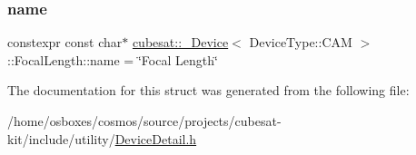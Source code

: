 \subsubsection{\texorpdfstring{name}{name}}
{\footnotesize\ttfamily constexpr const char$\ast$ \hyperlink{structcubesat_1_1__Device}{cubesat\+::\+\_\+\+Device}$<$ Device\+Type\+::\+C\+AM $>$\+::Focal\+Length\+::name = \char`\"{}Focal Length\char`\"{}\hspace{0.3cm}{\ttfamily [static]}}



The documentation for this struct was generated from the following file\+:\begin{DoxyCompactItemize}
\item 
/home/osboxes/cosmos/source/projects/cubesat-\/kit/include/utility/\hyperlink{DeviceDetail_8h}{Device\+Detail.\+h}\end{DoxyCompactItemize}
